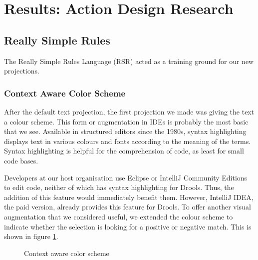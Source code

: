 \section{Results: Action Design Research}\label{section:Results_ADR}

\subsection{Really Simple Rules}

The Really Simple Rules Language (RSR) acted as a training ground for our new projections.

\subsubsection{Context Aware Color Scheme}
After the default text projection, the first projection we made was giving the text a colour scheme.
This form or augmentation in IDEs is probably the most basic that we see.
Available in structured editors since the 1980s\cite{cowlishaw1987lexx}, syntax highlighting displays text in various colours and fonts according to the meaning of the terms.
Syntax highlighting is helpful for the comprehension of code, as least for small code bases\cite{sarkar2015impact}.

Developers at our host organisation use Eclipse or IntelliJ Community Editions to edit code, neither of which has syntax highlighting for Drools. Thus, the addition of this feature would immediately benefit them.
However, IntelliJ IDEA, the paid version, already provides this feature for Drools.
To offer another visual augmentation that we considered useful, we extended the colour scheme to indicate whether the selection is looking for a positive or negative match.
This is shown in figure \ref{fig:colorscheme}.

\begin{figure}[h]
    \centering
    \caption{Context aware color scheme}
    \label{fig:colorscheme}
\end{figure}

